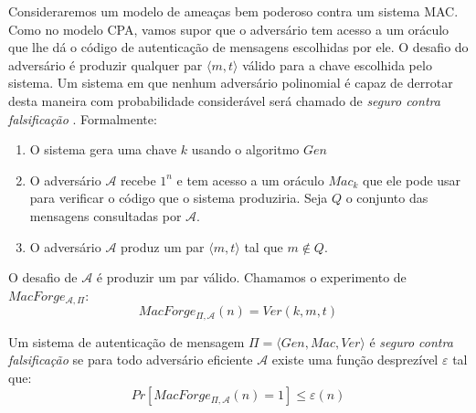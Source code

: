 Consideraremos um modelo de ameaças bem poderoso contra um sistema MAC.
Como no modelo CPA, vamos supor que o adversário tem acesso a um oráculo que lhe dá o código de autenticação de mensagens escolhidas por ele.
O desafio do adversário é produzir qualquer par $\langle m, t \rangle$ válido para a chave escolhida pelo sistema.
Um sistema em que nenhum adversário polinomial é capaz de derrotar desta maneira com probabilidade considerável será chamado de {\em seguro contra falsificação} \cite{Bellare00}.
Formalmente:
\begin{enumerate}
\item O sistema gera uma chave $k$ usando o algoritmo $Gen$
\item O adversário $\mathcal{A}$ recebe $1^n$ e tem acesso a um oráculo $Mac_k$ que ele pode usar para verificar o código que o sistema produziria. Seja $Q$ o conjunto das mensagens consultadas por $\mathcal{A}$.
\item O adversário $\mathcal{A}$ produz um par $\langle m, t \rangle$ tal que $m \notin Q$.
\end{enumerate}

\begin{center}
\end{center}

O desafio de $\mathcal{A}$ é produzir um par válido.
Chamamos o experimento de $MacForge_{\mathcal{A}, \Pi}$:
\begin{displaymath}
  MacForge_{\Pi, \mathcal{A}}(n) = Ver(k, m, t)
\end{displaymath}

Um sistema de autenticação de mensagem $\Pi = \langle Gen, Mac, Ver \rangle$ é {\em seguro contra falsificação} se para todo adversário eficiente $\mathcal{A}$ existe uma função desprezível $\varepsilon$ tal que:
\begin{displaymath}
  Pr[MacForge_{\Pi, \mathcal{A}}(n) = 1] \leq \varepsilon(n)
\end{displaymath}

